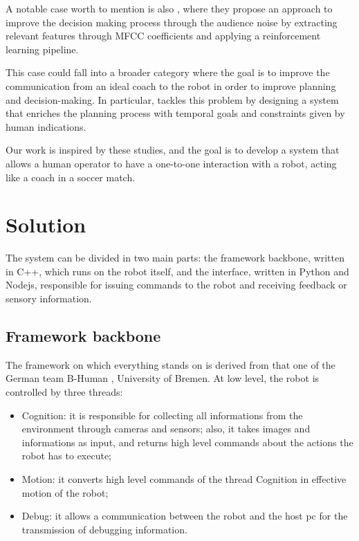 \documentclass[a4paper, onecolumn, 12pt]{article}
\begin{document}
A notable case worth to mention is also \cite{antonioni}, where they propose an
approach to improve the decision making process through the audience noise by
extracting relevant features through MFCC coefficients and applying a
reinforcement learning pipeline. 

This case could fall into a broader category where the goal is to improve the
communication from an ideal coach to the robot in order to improve planning and
decision-making. In particular, \cite{musumeci} tackles this problem by
designing a system that enriches the planning process with temporal goals and
constraints given by human indications. 

Our work is inspired by these studies, and the goal is to develop a system that
allows a human operator to have a one-to-one interaction with a robot, acting
like a coach in a soccer match.

\newpage
\section{Solution}
\label{sec:sol}

The system can be divided in two main parts: the framework backbone, written in
C++, which runs on the robot itself, and the interface, written in Python and
Nodejs, responsible for issuing commands to the robot and receiving feedback or
sensory information. 

\subsection{Framework backbone}
The framework on which everything stands on is derived from that one of the
German team B-Human \cite{bhuman2023}, University of Bremen. At low level, the robot is 
controlled by three threads:
\begin{itemize}
    \item Cognition: it is responsible for collecting all informations from the 
    environment through cameras and sensors; also, it takes images and informations as input,
    and returns high level commands about the actions the robot has to execute;
    \item Motion: it converts high level commands of the thread Cognition in effective
    motion of the robot;
    \item Debug: it allows a communication between the robot and the host pc for the 
    transmission of debugging information.
\end{itemize}
\end{document}
